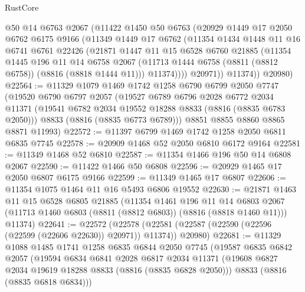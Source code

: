 \begin{lexlean}{RustCore}
\begin{coremodule}
          @50
          @14
          @6763
          @2067
          (@11422
            @1450
            @50
            @6763
            (@20929
              @1449
              @17
              @2050
              @6762
              @6175
              @9166
              (@11349
                @1449
                @17
                @6762
                (@11354
                  @1434
                  @1448
                  @11
                  @16
                  @6741
                  @6761
                  @22426
                  (@21871
                    @1447
                    @11
                    @15
                    @6528
                    @6760
                    @21885
                    (@11354
                      @1445
                      @196
                      @11
                      @14
                      @6758
                      @2067
                      (@11713 @1444 @6758 (@8811 (@8812 @6758)) (@8816 (@8818 @1444 @11)))
                      @11374))))
              @20971))
          @11374))
      @20980)
@22564 := @11329
    @1079
    @1469
    @1742
    @1258
    @6790
    @6799
    @2050
    @7747
    (@19520
      @6790
      @6797
      @2057
      (@19527
        @6789
        @6796
        @2028
        @6772
        @2034
        @11371
        (@19541 @6782 @2034 @19552 @18288 @8833 (@8816 (@8835 @6783 @2050)))
        @8833
        (@8816 (@8835 @6773 @6789)))
      @8851
      @8855
      @8860
      @8865
      @8871
      @11993)
@22572 := @11397 @6799 @1469 @1742 @1258 @2050 @6811 @6835 @7745
@22578 := @20909 @1468 @52 @2050 @6810 @6172 @9164
@22581 := @11349 @1468 @52 @6810
@22587 := @11354 @1466 @196 @50 @14 @6808 @2067
@22590 := @11422 @1466 @50 @6808
@22596 := @20929 @1465 @17 @2050 @6807 @6175 @9166
@22599 := @11349 @1465 @17 @6807
@22606 := @11354 @1075 @1464 @11 @16 @5493 @6806 @19552
@22630 := @21871
    @1463
    @11
    @15
    @6528
    @6805
    @21885
    (@11354
      @1461
      @196
      @11
      @14
      @6803
      @2067
      (@11713 @1460 @6803 (@8811 (@8812 @6803)) (@8816 (@8818 @1460 @11)))
      @11374)
@22641 := @22572
    (@22578 (@22581 (@22587 (@22590 (@22596 (@22599 (@22606 @22630)) @20971)) @11374)) @20980)
@22681 := @11329
    @1088
    @1485
    @1741
    @1258
    @6835
    @6844
    @2050
    @7745
    (@19587
      @6835
      @6842
      @2057
      (@19594
        @6834
        @6841
        @2028
        @6817
        @2034
        @11371
        (@19608 @6827 @2034 @19619 @18288 @8833 (@8816 (@8835 @6828 @2050)))
        @8833
        (@8816 (@8835 @6818 @6834)))

\end{coremodule}
\end{lexlean}

